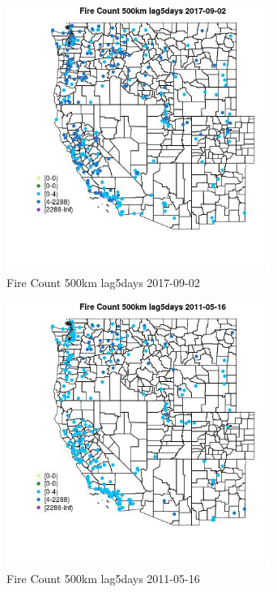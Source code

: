\begin{figure} 
\centering  
\includegraphics[width=0.77\textwidth]{Code_Outputs/Report_ML_input_PM25_Step4_part_e_de_duplicated_aves_compiled_2019-05-20wNAs_MapObsFire_Count_500km_lag5days2017-09-02.jpg} 
\caption{\label{fig:Report_ML_input_PM25_Step4_part_e_de_duplicated_aves_compiled_2019-05-20wNAsMapObsFire_Count_500km_lag5days2017-09-02}Fire Count 500km lag5days 2017-09-02} 
\end{figure} 
 

\begin{figure} 
\centering  
\includegraphics[width=0.77\textwidth]{Code_Outputs/Report_ML_input_PM25_Step4_part_e_de_duplicated_aves_compiled_2019-05-20wNAs_MapObsFire_Count_500km_lag5days2011-05-16.jpg} 
\caption{\label{fig:Report_ML_input_PM25_Step4_part_e_de_duplicated_aves_compiled_2019-05-20wNAsMapObsFire_Count_500km_lag5days2011-05-16}Fire Count 500km lag5days 2011-05-16} 
\end{figure} 
 

